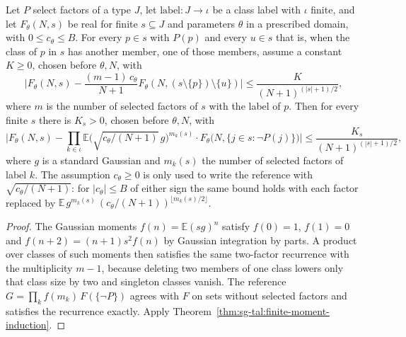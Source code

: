 \begin{theorem}
\label{thm:sg-tal:gaussian-class-reference}
\leanok
{}
Let $P$ select factors of a type $J$, let $\mathrm{label}:J\to\iota$ be a class label with $\iota$ finite,
and let $F_\theta(N,s)$ be real for finite $s\subseteq J$ and parameters $\theta$ in a prescribed
domain, with $0\le c_\theta\le B$. For every $p\in s$ with $P(p)$ and every $u\in s$ that is,
when the class of $p$ in $s$ has another member, one of those members, assume a constant
$K\ge0$, chosen before $\theta,N$, with
\[
 \Big|F_\theta(N,s)-\frac{(m-1)\,c_\theta}{N+1}F_\theta(N,(s\setminus\{p\})\setminus\{u\})\Big|
 \le\frac{K}{(N+1)^{(|s|+1)/2}},
\]
where $m$ is the number of selected factors of $s$ with the label of $p$. Then for every finite $s$
there is $K_s>0$, chosen before $\theta,N$, with
\[
 \Big|F_\theta(N,s)-\prod_{k\in\iota}\mathbb E\big(\sqrt{c_\theta/(N+1)}\,g\big)^{m_k(s)}
 \cdot F_\theta\big(N,\{j\in s:\neg P(j)\}\big)\Big|\le\frac{K_s}{(N+1)^{(|s|+1)/2}},
\]
where $g$ is a standard Gaussian and $m_k(s)$ the number of selected factors of label $k$. The assumption
$c_\theta\ge0$ is only used to write the reference with $\sqrt{c_\theta/(N+1)}$: for $|c_\theta|\le B$ of either
sign the same bound holds with each factor replaced by $\mathbb E\,g^{m_k(s)}\,(c_\theta/(N+1))^{\lfloor m_k(s)/2\rfloor}$.
\end{theorem}
\begin{proof}
\leanok
The Gaussian moments $f(n)=\mathbb E(sg)^n$ satisfy $f(0)=1$, $f(1)=0$ and
$f(n+2)=(n+1)s^2f(n)$ by Gaussian integration by parts. A product over classes of such moments
then satisfies the same two-factor recurrence with the multiplicity $m-1$, because deleting two
members of one class lowers only that class size by two and singleton classes vanish. The
reference $G=\prod_kf(m_k)\,F(\{\neg P\})$ agrees with $F$ on sets without selected factors and
satisfies the recurrence exactly. Apply Theorem~\ref{thm:sg-tal:finite-moment-induction}.
\end{proof}

